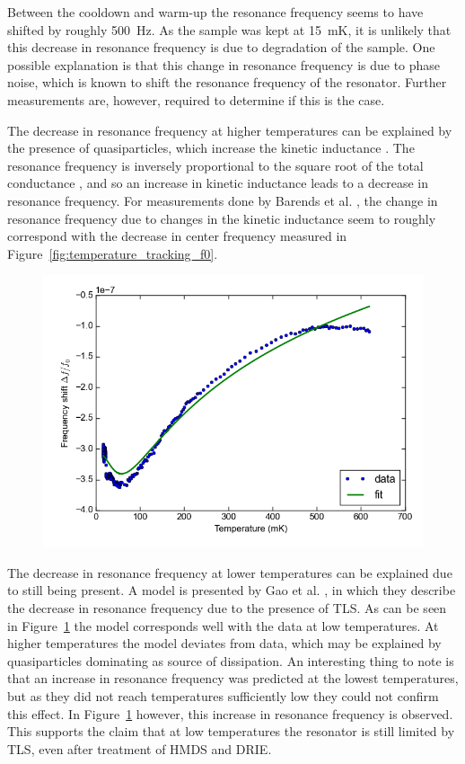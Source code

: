 \documentclass[12pt]{report}
\begin{document}
Between the cooldown and warm-up the resonance frequency seems to have shifted by roughly \SI{500}{Hz}. As the sample was kept at \SI{15}{\milli \kelvin}, it is unlikely that this decrease in resonance frequency is due to degradation of the sample. One possible explanation is that this change in resonance frequency is due to phase noise, which is known to shift the resonance frequency of the resonator. Further measurements are, however, required to determine if this is the case.

The decrease in resonance frequency at higher temperatures can be explained by the presence of quasiparticles, which increase the kinetic inductance \cite[p.~91]{Geerlings}. The resonance frequency is inversely proportional to the square root of the total conductance \cite{barends2008contribution}, and so an increase in kinetic inductance leads to a decrease in resonance frequency. For measurements done by Barends et al. \cite{barends2008contribution}, the change in resonance frequency due to changes in the kinetic inductance seem to roughly correspond with the decrease in center frequency measured in Figure~\ref{fig:temperature_tracking_f0}.

\begin{figure}[h]
    \centering
    \includegraphics[width=.7\textwidth]{Figures/Temperature increase tracking - f0 vs T with fit.png}
    \label{fig:f0_vs_T_with_fit}
\end{figure}

The decrease in resonance frequency at lower temperatures can be explained due to still being present. A model is presented by Gao et al. \cite{gao2008experimental}, in which they describe the decrease in resonance frequency due to the presence of TLS. As can be seen in Figure~\ref{fig:f0_vs_T_with_fit} the model corresponds well with the data at low temperatures. At higher temperatures the model deviates from data, which may be explained by quasiparticles dominating as source of dissipation. An interesting thing to note is that an increase in resonance frequency was predicted at the lowest temperatures, but as they did not reach temperatures sufficiently low they could not confirm this effect. In Figure~\ref{fig:f0_vs_T_with_fit} however, this increase in resonance frequency is observed. This supports the claim that at low temperatures the resonator is still limited by TLS, even after treatment of HMDS and DRIE.
\end{document}
